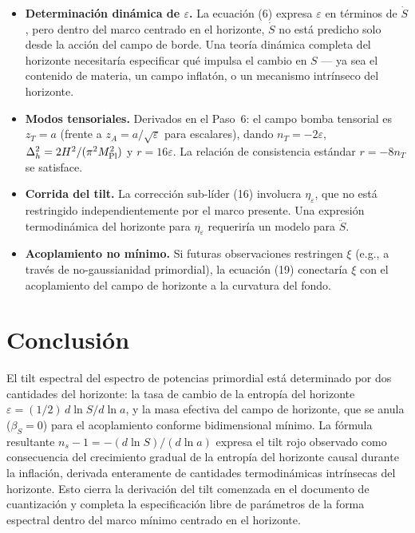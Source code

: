 \documentclass[12pt,a4paper]{article}
\begin{document}
\begin{itemize}
  \item \textbf{Determinación dinámica de $\varepsilon$.} La ecuación (6) expresa $\varepsilon$ en términos de $\dot{S}$, pero dentro del marco centrado en el horizonte, $\dot{S}$ no está predicho solo desde la acción del campo de borde. Una teoría dinámica completa del horizonte necesitaría especificar qué impulsa el cambio en $S$ --- ya sea el contenido de materia, un campo inflatón, o un mecanismo intrínseco del horizonte.
  \item \textbf{Modos tensoriales.} Derivados en el Paso~6: el campo bomba tensorial es $z_T = a$ (frente a $z_A = a/\sqrt\varepsilon$ para escalares), dando $n_T = -2\varepsilon$, $\Delta_h^2 = 2H^2/(\pi^2 M_{\rm Pl}^2)$ y $r = 16\varepsilon$. La relación de consistencia estándar $r = -8n_T$ se satisface.
  \item \textbf{Corrida del tilt.} La corrección sub-líder (16) involucra $\eta_\varepsilon$, que no está restringido independientemente por el marco presente. Una expresión termodinámica del horizonte para $\eta_\varepsilon$ requeriría un modelo para $\ddot{S}$.
  \item \textbf{Acoplamiento no mínimo.} Si futuras observaciones restringen $\xi$ (e.g., a través de no-gaussianidad primordial), la ecuación (19) conectaría $\xi$ con el acoplamiento del campo de horizonte a la curvatura del fondo.
\end{itemize}

\section{Conclusión}

El tilt espectral del espectro de potencias primordial está determinado por dos cantidades del horizonte: la tasa de cambio de la entropía del horizonte $\varepsilon = (1/2)\, d\ln S/d\ln a$, y la masa efectiva del campo de horizonte, que se anula ($\beta_S = 0$) para el acoplamiento conforme bidimensional mínimo. La fórmula resultante $n_s - 1 = -(d\ln S)/(d\ln a)$ expresa el tilt rojo observado como consecuencia del crecimiento gradual de la entropía del horizonte causal durante la inflación, derivada enteramente de cantidades termodinámicas intrínsecas del horizonte. Esto cierra la derivación del tilt comenzada en el documento de cuantización y completa la especificación libre de parámetros de la forma espectral dentro del marco mínimo centrado en el horizonte.
\end{document}
